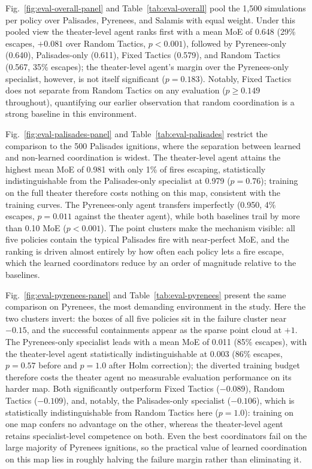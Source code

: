 Fig.~\ref{fig:eval-overall-panel} and Table~\ref{tab:eval-overall} pool the
1{,}500 simulations per policy over Palisades, Pyrenees, and Salamis with
equal weight. Under this pooled view the theater-level agent ranks first with
a mean MoE of 0.648 (29\% escapes, $+0.081$ over Random Tactics,
$p < 0.001$), followed by Pyrenees-only (0.640), Palisades-only (0.611),
Fixed Tactics (0.579), and Random Tactics (0.567, 35\% escapes); the
theater-level agent's margin over the Pyrenees-only specialist, however, is
not itself significant ($p = 0.183$). Notably, Fixed Tactics does not
separate from Random Tactics on any evaluation ($p \geq 0.149$ throughout),
quantifying our earlier observation that random coordination is a strong
baseline in this environment.

Fig.~\ref{fig:eval-palisades-panel} and Table~\ref{tab:eval-palisades}
restrict the comparison to the 500 Palisades ignitions, where the separation
between learned and non-learned coordination is widest. The theater-level
agent attains the highest mean MoE of 0.981 with only 1\% of fires escaping,
statistically indistinguishable from the Palisades-only specialist at 0.979
($p = 0.76$); training on the full theater therefore costs nothing on this
map, consistent with the training curves. The Pyrenees-only agent transfers
imperfectly (0.950, 4\% escapes, $p = 0.011$ against the theater agent),
while both baselines trail by more than 0.10 MoE ($p < 0.001$). The point
clusters make the mechanism visible: all five policies contain the typical
Palisades fire with near-perfect MoE, and the ranking is driven almost
entirely by how often each policy lets a fire escape, which the learned
coordinators reduce by an order of magnitude relative to the baselines.

Fig.~\ref{fig:eval-pyrenees-panel} and Table~\ref{tab:eval-pyrenees} present
the same comparison on Pyrenees, the most demanding environment in the study.
Here the two clusters invert: the boxes of all five policies sit in the
failure cluster near $-0.15$, and the successful containments appear as the
sparse point cloud at $+1$. The Pyrenees-only specialist leads with a mean
MoE of 0.011 (85\% escapes), with the theater-level agent statistically
indistinguishable at 0.003 (86\% escapes, $p = 0.57$ before and $p = 1.0$
after Holm correction); the diverted training budget therefore costs the
theater agent no measurable evaluation performance on its harder map. Both
significantly outperform Fixed Tactics ($-0.089$), Random Tactics
($-0.109$), and, notably, the Palisades-only specialist ($-0.106$), which is
statistically indistinguishable from Random Tactics here ($p = 1.0$):
training on one map confers no advantage on the other, whereas the
theater-level agent retains specialist-level competence on both. Even the
best coordinators fail on the large majority of Pyrenees ignitions, so the
practical value of learned coordination on this map lies in roughly halving
the failure margin rather than eliminating it.

